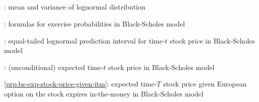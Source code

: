 \subsection*{}
\item {}: mean and variance of lognormal distribution
\item {}: formulas for exercise probabilities in Black-Scholes model
\item {}: equal-tailed lognormal prediction interval for time-\(t\) stock price in Black-Scholes model
\item {}: (unconditional) expected time-\(t\) stock price in Black-Scholes model
\item \cref{prp:bs-exp-stock-price-given-itm}: expected time-\(T\) stock price
given European option on the stock expires in-the-money in Black-Scholes model
